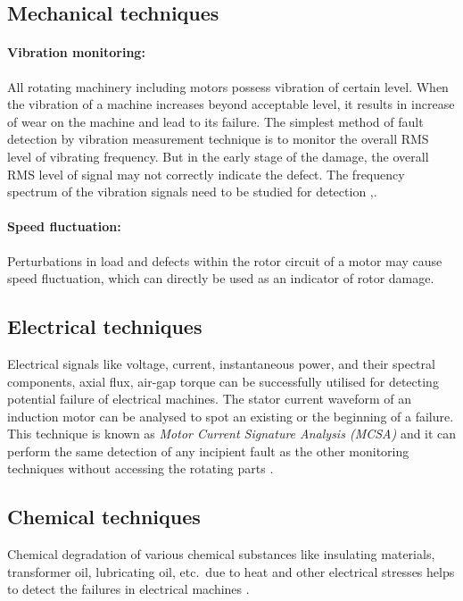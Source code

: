 \documentclass[a4paper,11pt]{report}
\begin{document}
\subsection*{Mechanical techniques}
\paragraph{Vibration monitoring:} All rotating machinery including motors possess vibration of certain level. When the vibration of a machine increases beyond acceptable level, it results in increase of wear on the machine and lead to its failure. The simplest method of fault detection by vibration measurement technique is to monitor the overall RMS level of vibrating frequency. But in the early stage of the damage, the overall RMS level of signal may not correctly indicate the defect. The frequency spectrum of the vibration signals need to be studied for detection \cite{rps6},\cite{rps14}.

\paragraph{Speed fluctuation:} Perturbations in load and defects within the rotor circuit of a motor may cause speed fluctuation, which can directly be used as an indicator of rotor damage.

\subsection*{Electrical techniques}
Electrical signals like voltage, current, instantaneous power, and their spectral components, axial flux, air-gap torque can be successfully utilised for detecting potential failure of electrical machines. The stator current waveform of an induction motor can be analysed to spot an existing or the beginning of a failure. This technique is known as \emph{Motor Current Signature Analysis (MCSA)} and it can perform the same detection of any incipient fault as the other monitoring techniques without accessing the rotating parts \cite{57}.

\subsection*{Chemical techniques}
Chemical degradation of various chemical substances like insulating materials, transformer oil, lubricating oil, etc.~due to heat and other electrical stresses helps to detect the failures in electrical machines \cite{rps6}.
\end{document}

